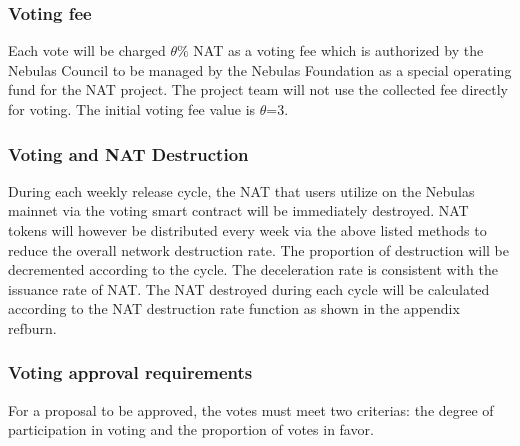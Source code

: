 \subsubsection{Voting fee}

Each vote will be charged $\theta$\% NAT as a voting fee which is authorized by the Nebulas Council to be managed by the Nebulas Foundation as a special operating fund for the NAT project. The project team will not use the collected fee directly for voting. The initial voting fee value is $\theta$=3.

\subsubsection{Voting and NAT Destruction}

During each weekly release cycle, the NAT that users utilize on the Nebulas mainnet via the voting smart contract will be immediately destroyed. NAT tokens will however be distributed every week via the above listed methods to reduce the overall network destruction rate. The proportion of destruction will be decremented according to the cycle. The deceleration rate is consistent with the issuance rate of NAT. The NAT destroyed during each cycle will be calculated according to the NAT destruction rate function as shown in the appendix ref{burn}.

\subsubsection{Voting approval requirements}

For a proposal to be approved, the votes must meet two criterias: the degree of participation in voting and the proportion of votes in favor.

